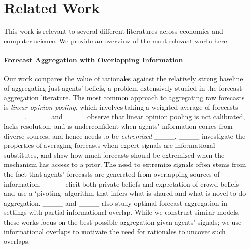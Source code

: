 \section{Related Work}
This work is relevant to several different literatures across economics and computer science. We provide an overview of the most relevant works here:

\paragraph{Forecast Aggregation with Overlapping Information} Our work compares the value of rationales against the relatively strong baseline of aggregating just agents' beliefs, a problem extensively studied in the forecast aggregation literature. The most common approach to aggregating raw forecasts is \emph{linear opinion pooling}, which involves taking a weighted average of forecasts ____. ____ and ____ observe that linear opinion pooling is not calibrated, lacks resolution, and is underconfident when agents' information comes from diverse sources, and hence needs to be \emph{extremized} ____.  ____ investigate the properties of averaging forecasts when expert signals are informational substitutes, and show how much forecasts should be extremized when the mechanism has access to a prior.
The need to extremize signals often stems from the fact that agents' forecasts are generated from overlapping sources of information. ____ elicit both private beliefs and expectation of crowd beliefs and use a `pivoting' algorithm that infers what is shared and what is novel to do aggregation. ____ and ____ also study optimal forecast aggregation in settings with partial informational overlap. While we construct similar models, these works focus on the best possible aggregation given agents' signals; we use informational overlaps to motivate the need for rationales to uncover such overlaps.

